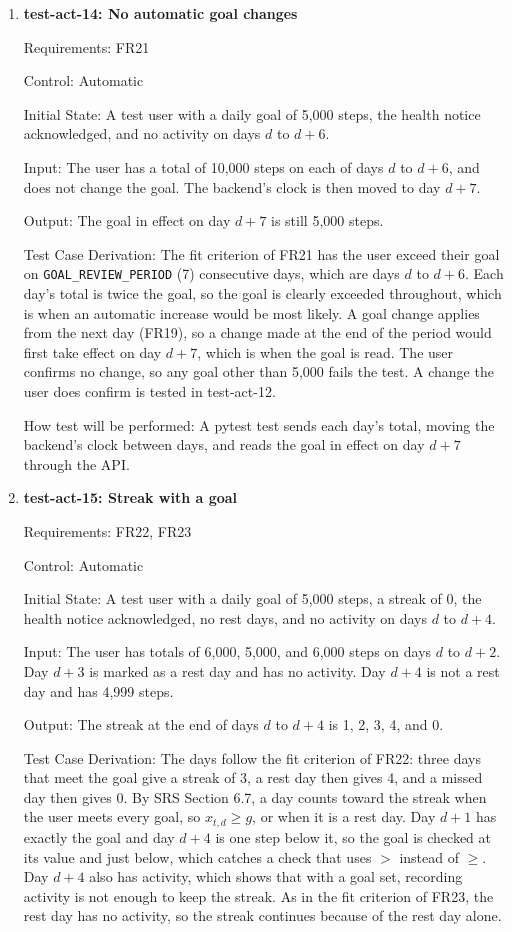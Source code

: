 \documentclass[12pt, titlepage]{article}
\begin{document}
\begin{enumerate}
How test will be performed: As in test-act-1.

\item{\textbf{test-act-14: No automatic goal changes}\\}

Requirements: FR21

Control: Automatic

Initial State: A test user with a daily goal of 5,000 steps, the health notice
acknowledged, and no activity on days $d$ to $d+6$.

Input: The user has a total of 10,000 steps on each of days $d$ to $d+6$, and
does not change the goal. The backend's clock is then moved to day $d+7$.

Output: The goal in effect on day $d+7$ is still 5,000 steps.

Test Case Derivation: The fit criterion of FR21 has the user exceed their goal
on \texttt{GOAL\_REVIEW\_PERIOD} (7) consecutive days, which are days $d$ to
$d+6$. Each day's total is twice the goal, so the goal is clearly exceeded
throughout, which is when an automatic increase would be most likely. A goal
change applies from the next day (FR19), so a change made at the end of the
period would first take effect on day $d+7$, which is when the goal is read.
The user confirms no change, so any goal other than 5,000 fails the test. A
change the user does confirm is tested in test-act-12.

How test will be performed: A pytest test sends each day's total, moving the
backend's clock between days, and reads the goal in effect on day $d+7$
through the API.

\item{\textbf{test-act-15: Streak with a goal}\\}

Requirements: FR22, FR23

Control: Automatic

Initial State: A test user with a daily goal of 5,000 steps, a streak of 0,
the health notice acknowledged, no rest days, and no activity on days $d$ to
$d+4$.

Input: The user has totals of 6,000, 5,000, and 6,000 steps on days $d$ to
$d+2$. Day $d+3$ is marked as a rest day and has no activity. Day $d+4$ is not
a rest day and has 4,999 steps.

Output: The streak at the end of days $d$ to $d+4$ is 1, 2, 3, 4, and 0.

Test Case Derivation: The days follow the fit criterion of FR22: three days
that meet the goal give a streak of 3, a rest day then gives 4, and a missed
day then gives 0. By SRS Section 6.7, a day counts toward the streak when the
user meets every goal, so $x_{t,d} \geq g$, or when it is a rest day. Day
$d+1$ has exactly the goal and day $d+4$ is one step below it, so the goal is
checked at its value and just below, which catches a check that uses $>$
instead of $\geq$. Day $d+4$ also has activity, which shows that with a goal
set, recording activity is not enough to keep the streak. As in the fit
criterion of FR23, the rest day has no activity, so the streak continues
because of the rest day alone.


\end{enumerate}
\end{document}
